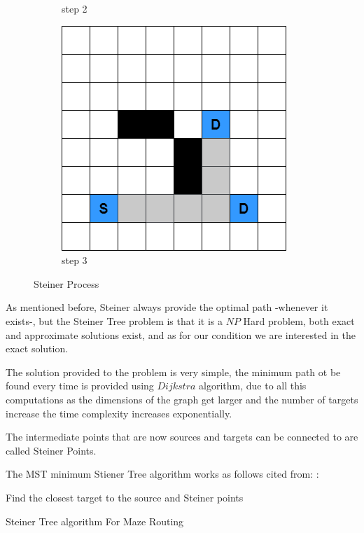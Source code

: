 \begin{figure}
\begin{subfigure}[b]{0.3\linewidth}
            \caption{step 2}
        \end{subfigure}
        \begin{subfigure}[b]{0.3\linewidth}
            \includegraphics[width=\linewidth]{figures/Steiner Stages/steiner_3.png}
            \caption{step 3}
        \end{subfigure}

        \caption{Steiner Process}
        \label{fig:steinerStages}
    \end{figure}

    As mentioned before, Steiner always provide the optimal path -whenever it exists-,
    but the Steiner Tree problem is that it is a $NP$ Hard problem, 
    both exact and approximate solutions exist,
    and as for our condition we are interested in the exact solution.

    The solution provided to the problem is very simple, the minimum path ot be found 
    every time is provided using $Dijkstra$ algorithm, due to all this computations as the dimensions of the graph get larger and the number
    of targets increase the time complexity increases exponentially.

    The intermediate points that are now sources and targets can be connected to are called
    Steiner Points.

    The MST minimum Stiener Tree algorithm works as follows cited from: \cite{SteinerRef}:    
    \begin{algorithm}[h!]
        \SetAlgoLined
        Find the closest target to the source and Steiner points\;
         \caption{Steiner Tree algorithm For Maze Routing}
    \end{algorithm}
        
    

    